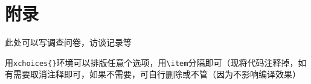 \chapter*{附录}

此处可以写调查问卷，访谈记录等

用\verb|xchoices{}|环境可以排版任意个选项，用\verb|\item|分隔即可（现将代码注释掉，如有需要取消注释即可，如果不需要，可自行删除或不管（因为不影响编译效果）



